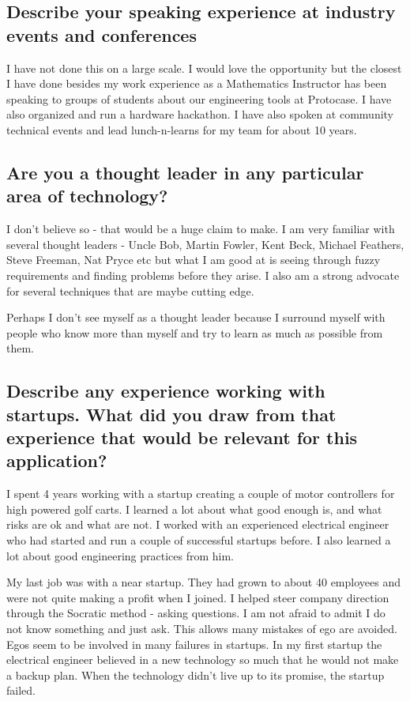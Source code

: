 \documentclass[letter,12pt]{article}
\begin{document}
\subsection{Describe your speaking experience at industry events and conferences}
I have not done this on a large scale. I would love the opportunity but the closest I have done besides my work experience as a Mathematics Instructor has been speaking to groups of students about our engineering tools at Protocase. I have also organized and run a hardware hackathon. I have also spoken at community technical events and lead lunch-n-learns for my team for about 10 years.

\subsection{Are you a thought leader in any particular area of technology?}
I don't believe so - that would be a huge claim to make. I am very familiar with several thought leaders - Uncle Bob, Martin Fowler, Kent Beck, Michael Feathers, Steve Freeman, Nat Pryce etc but what I am good at is seeing through fuzzy requirements and finding problems before they arise. I also am a strong advocate for several techniques that are maybe cutting edge.

Perhaps I don't see myself as a thought leader because I surround myself with people who know more than myself and try to learn as much as possible from them.

\subsection{Describe any experience working with startups. What did you draw from that experience that would be relevant for this application?}
I spent 4 years working with a startup creating a couple of motor controllers for high powered golf carts. I learned a lot about what good enough is, and what risks are ok and what are not. I worked with an experienced electrical engineer who had started and run a couple of successful startups before. I also learned a lot about good engineering practices from him.

My last job was with a near startup. They had grown to about 40 employees and were not quite making a profit when I joined. I helped steer company direction through the Socratic method - asking questions. I am not afraid to admit I do not know something and just ask. This allows many mistakes of ego are avoided. Egos seem to be involved in many failures in startups. In my first startup the electrical engineer believed in a new technology so much that he would not make a backup plan. When the technology didn't live up to its promise, the startup failed.
\end{document}
